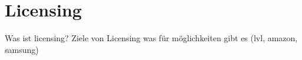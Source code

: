 \section{Licensing} \label{section:introduction-licensing}
Was ist licensing?\newline
Ziele von Licensing\newline
was für möglichkeiten gibt es (lvl, amazon, samsung)\newline
